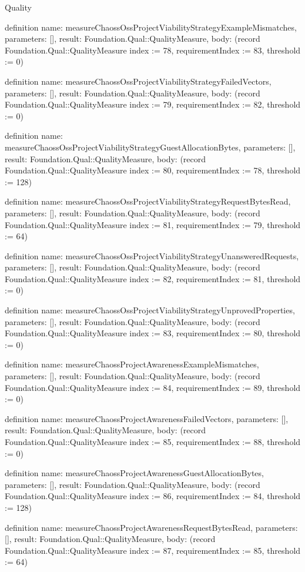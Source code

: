 \begin{lexlean}{Quality}
\begin{semanticmodule}
definition{
  name: measureChaossOssProjectViabilityStrategyExampleMismatches,
  parameters: [],
  result: Foundation.Qual::QualityMeasure,
  body: (record Foundation.Qual::QualityMeasure {index := 78, requirementIndex := 83, threshold := 0})
}

definition{
  name: measureChaossOssProjectViabilityStrategyFailedVectors,
  parameters: [],
  result: Foundation.Qual::QualityMeasure,
  body: (record Foundation.Qual::QualityMeasure {index := 79, requirementIndex := 82, threshold := 0})
}

definition{
  name: measureChaossOssProjectViabilityStrategyGuestAllocationBytes,
  parameters: [],
  result: Foundation.Qual::QualityMeasure,
  body: (record Foundation.Qual::QualityMeasure {index := 80, requirementIndex := 78, threshold := 128})
}

definition{
  name: measureChaossOssProjectViabilityStrategyRequestBytesRead,
  parameters: [],
  result: Foundation.Qual::QualityMeasure,
  body: (record Foundation.Qual::QualityMeasure {index := 81, requirementIndex := 79, threshold := 64})
}

definition{
  name: measureChaossOssProjectViabilityStrategyUnansweredRequests,
  parameters: [],
  result: Foundation.Qual::QualityMeasure,
  body: (record Foundation.Qual::QualityMeasure {index := 82, requirementIndex := 81, threshold := 0})
}

definition{
  name: measureChaossOssProjectViabilityStrategyUnprovedProperties,
  parameters: [],
  result: Foundation.Qual::QualityMeasure,
  body: (record Foundation.Qual::QualityMeasure {index := 83, requirementIndex := 80, threshold := 0})
}

definition{
  name: measureChaossProjectAwarenessExampleMismatches,
  parameters: [],
  result: Foundation.Qual::QualityMeasure,
  body: (record Foundation.Qual::QualityMeasure {index := 84, requirementIndex := 89, threshold := 0})
}

definition{
  name: measureChaossProjectAwarenessFailedVectors,
  parameters: [],
  result: Foundation.Qual::QualityMeasure,
  body: (record Foundation.Qual::QualityMeasure {index := 85, requirementIndex := 88, threshold := 0})
}

definition{
  name: measureChaossProjectAwarenessGuestAllocationBytes,
  parameters: [],
  result: Foundation.Qual::QualityMeasure,
  body: (record Foundation.Qual::QualityMeasure {index := 86, requirementIndex := 84, threshold := 128})
}

definition{
  name: measureChaossProjectAwarenessRequestBytesRead,
  parameters: [],
  result: Foundation.Qual::QualityMeasure,
  body: (record Foundation.Qual::QualityMeasure {index := 87, requirementIndex := 85, threshold := 64})
}


\end{semanticmodule}
\end{lexlean}
